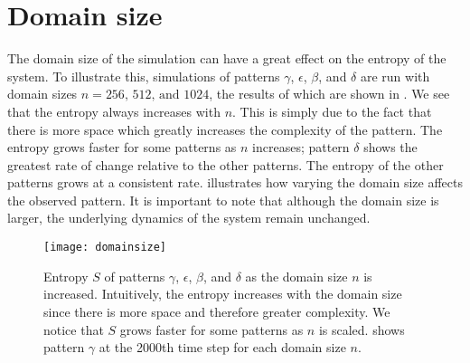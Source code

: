 \section{Domain size}

The domain size of the simulation can have a great effect on the entropy of the system. To illustrate this, simulations of patterns $\gamma$, $\epsilon$, $\beta$, and $\delta$ are run with domain sizes $n = 256,\, 512,\, \text{and } 1024$, the results of which are shown in . We see that the entropy always increases with $n$. This is simply due to the fact that there is more space which greatly increases the complexity of the pattern. The entropy grows faster for some patterns as $n$ increases; pattern $\delta$ shows the greatest rate of change relative to the other patterns. The entropy of the other patterns grows at a consistent rate.  illustrates how varying the domain size affects the observed pattern. It is important to note that although the domain size is larger, the underlying dynamics of the system remain unchanged.
%
\begin{figure}[h]
	\centering
	\texttt{[image: domainsize]}
	\caption{Entropy $S$ of patterns $\gamma$, $\epsilon$, $\beta$, and $\delta$ as the domain size $n$ is increased. Intuitively, the entropy increases with the domain size since there is more space and therefore greater complexity. We notice that $S$ grows faster for some patterns as $n$ is scaled.  shows pattern $\gamma$ at the 2000th time step for each domain size $n$.}
	\label{fig:domainsize}
\end{figure}

